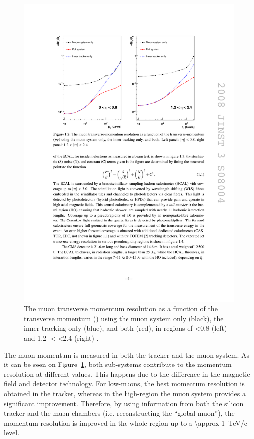 \begin{figure}[htbp]
  \begin{center}
    \leavevmode
    \includegraphics[width=\columnwidth]{muon_resolution}
    \caption{The muon transverse momentum resolution as a function of the transverse momentum (\pt) using the muon
    system only (black), the inner tracking only (blue), and both (red), in regions of \abs\eta \num{<0.8} (left) and
    \num{1.2} $<$\abs\eta\num{<2.4} (right) \cite{CMS}.}
    \label{muon_resolution}
  \end{center}
\end{figure}

The muon momentum is measured in both the tracker and the muon system.  As it can be seen on
Figure~\ref{muon_resolution}, both sub-systems contribute to the momentum resolution at different \pt values. This
happens due to the difference in the magnetic field and detector technology. For low-\pt muons, the best momentum
resolution is obtained in the tracker, whereas in the high-\pt region the muon system provides a significant
improvement. Therefore, by using information from both the silicon tracker and the muon chambers (i.e. reconstructing
the ``global muon''), the momentum resolution is improved in the whole \pt region up to a \SI{\approx 1}{\TeV/c} level.

